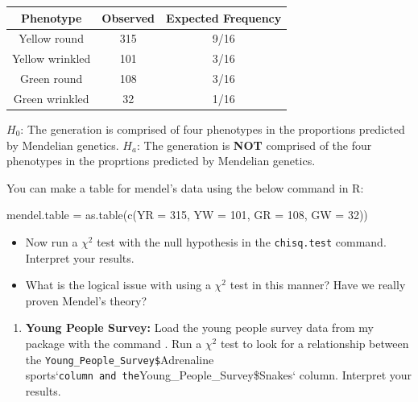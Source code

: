 \documentclass[
]{book}
\newenvironment{Shaded}{\begin{snugshade}}{\end{snugshade}}
\newcommand{\AttributeTok}[1]{\textcolor[rgb]{0.77,0.63,0.00}{#1}}
\newcommand{\DecValTok}[1]{\textcolor[rgb]{0.00,0.00,0.81}{#1}}
\newcommand{\FunctionTok}[1]{\textcolor[rgb]{0.00,0.00,0.00}{#1}}
\newcommand{\NormalTok}[1]{#1}
\newcommand{\OtherTok}[1]{\textcolor[rgb]{0.56,0.35,0.01}{#1}}
\providecommand{\tightlist}{%
  \setlength{\itemsep}{0pt}\setlength{\parskip}{0pt}}
\theoremstyle{definition}
\theoremstyle{definition}
\theoremstyle{definition}
\theoremstyle{definition}
\theoremstyle{remark}
\begin{document}
\begin{longtable}[]{@{}ccc@{}}
\toprule()
Phenotype & Observed & Expected Frequency \\
\midrule()
\endhead
Yellow round & 315 & 9/16 \\
Yellow wrinkled & 101 & 3/16 \\
Green round & 108 & 3/16 \\
Green wrinkled & 32 & 1/16 \\
\bottomrule()
\end{longtable}

\(H_0\): The generation is comprised of four phenotypes in the proportions predicted by Mendelian genetics.
\(H_a\): The generation is \textbf{NOT} comprised of the four phenotypes in the proprtions predicted by Mendelian genetics.

You can make a table for mendel's data using the below command in R:

\begin{Shaded}
\begin{Highlighting}[]
\NormalTok{mendel.table }\OtherTok{=} \FunctionTok{as.table}\NormalTok{(}\FunctionTok{c}\NormalTok{(}\AttributeTok{YR =} \DecValTok{315}\NormalTok{, }\AttributeTok{YW =} \DecValTok{101}\NormalTok{, }\AttributeTok{GR =} \DecValTok{108}\NormalTok{, }\AttributeTok{GW =} \DecValTok{32}\NormalTok{))}
\end{Highlighting}
\end{Shaded}

\begin{itemize}
\tightlist
\item
  Now run a \(\chi^2\) test with the null hypothesis in the \texttt{chisq.test} command. Interpret your results.\\
\item
  What is the logical issue with using a \(\chi^2\) test in this manner? Have we really proven Mendel's theory?
\end{itemize}

\begin{enumerate}
\def\labelenumi{\arabic{enumi}.}
\setcounter{enumi}{2}
\tightlist
\item
  \textbf{Young People Survey:}
  Load the young people survey data from my package with the command . Run a \(\chi^2\) test to look for a relationship between the \texttt{Young\_People\_Survey\$}Adrenaline sports`\texttt{column\ and\ the}Young\_People\_Survey\$Snakes` column. Interpret your results.
\end{enumerate}
\end{document}
